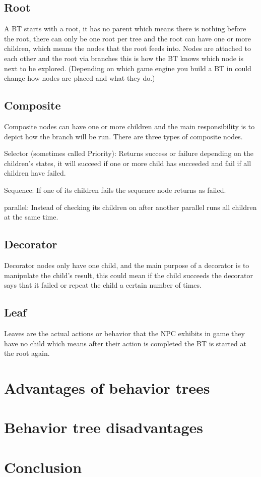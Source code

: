 \documentclass{scrartcl}
\begin{document}
\subsection{Root}

A BT starts with a root, it has no parent which means there is nothing before the root, there can only be one root per tree and the root can have one or more children, which means the nodes that the root feeds into. Nodes are attached to each other and the root via branches this is how the BT knows which node is next to be explored. (Depending on which game engine you build a BT in could change how nodes are placed and what they do.)

\subsection{Composite}

Composite nodes can have one or more children and the main responsibility is to depict how the branch will be run. There are three types of composite nodes. 

Selector (sometimes called Priority): Returns success or failure depending on the children's states, it will succeed if one or more child has succeeded and fail if all children have failed.

Sequence: If one of its children fails the sequence node returns as failed.

parallel: Instead of checking its children on after another parallel runs all children at the same time.

\subsection{Decorator}

Decorator nodes only have one child, and the main purpose of a decorator is to manipulate the child's result, this could mean if the child succeeds the decorator says that it failed or repeat the child a certain number of times.

\subsection{Leaf}

Leaves are the actual actions or behavior that the NPC exhibits in game they have no child which means after their action is completed the BT is started at the root again\cite{marzinotto2014towards}.

\section{Advantages of behavior trees}

\section{Behavior tree disadvantages}

\section{Conclusion}

 \cite{youtube} \cite{UE4} \cite{nicolau2016evolutionary} \cite{nareyek2004ai} 



\end{document}
